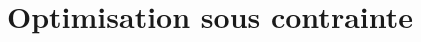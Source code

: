 \documentclass[a4paper,francais]{article}
\theoremstyle{definition}
\newtheorem{exercice}{Exercice}[section]
\newtheorem*{solution}{Solution}
\begin{document}




\section{Optimisation sous contrainte}
\label{sec:kkt}
\end{document}
